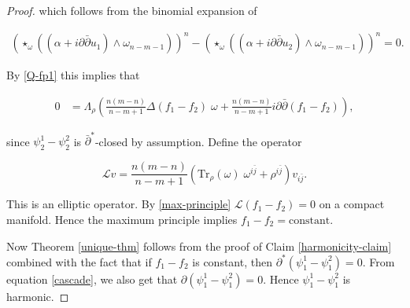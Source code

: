 \documentclass[10pt,a4paper]{amsart}
\newcommand{\bj}{\bar{j}}
\newcommand{\spartial}{\partial^*}
\newcommand{\bpartial}{\bar{\partial}}
\newcommand{\pbp}{\partial \bar{\partial}}
\newtheorem{remark}[theorem]{Remark}
\numberwithin{equation}{section}
\begin{document}
\begin{proof}
\noindent which follows from the binomial expansion of

\begin{equation}
    \begin{aligned}
         (\star_{\omega}\left((\alpha + i \pbp u_1)\wedge \omega_{n-m-1}\right))^n -  (\star_{\omega}\left((\alpha + i \pbp u_2)\wedge \omega_{n-m-1}\right))^n = 0.
    \end{aligned}
\end{equation}




 By \eqref{Q-fp1} this implies that

\begin{equation}\label{max-principle}
    \begin{aligned}
    0 &=\Lambda_{\rho}\left(\frac{n(m-n)}{n-m+1} \Delta (f_1 -f_2) \; \omega +   \frac{n(m-n)}{n-m+1} i \partial \bar{\partial} (f_1 - f_2)\right),
    \end{aligned}
\end{equation}

\noindent since $\psi^1_{2}-\psi^2_{2}$ is $\bpartial^*$-closed by assumption. Define the operator

$$\mathcal L v = \frac{n(m-n)}{n-m+1}\left( \mbox{Tr}_{\rho}(\omega)  \; \omega^{i \bj}  +  \rho^{i \bj}\right)v_{i \bj}.$$


This is an elliptic operator. By \eqref{max-principle} $\mathcal L(f_1 - f_2) = 0$ on a compact manifold. Hence the maximum principle implies $f_1 - f_2 = \text{constant}$.


Now Theorem \ref{unique-thm} follows from the proof of Claim \eqref{harmonicity-claim} combined with the fact that if $f_1 - f_2$ is constant, then $\spartial(\psi^1_1  - \psi^2_1) = 0$. From equation \eqref{cascade}, we also get that $\partial(\psi^1_1  - \psi^2_1) = 0$. Hence $\psi^1_1  - \psi^2_1$ is harmonic. 



\end{proof}





\end{document}
